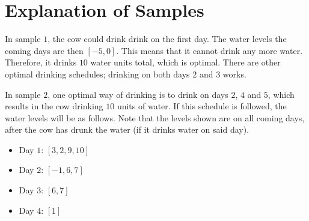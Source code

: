 \section*{Explanation of Samples}
In sample $1$, the cow could drink drink on the first day. The water levels the coming days are then
$[-5,0]$. This means that it cannot drink any more water. Therefore, it drinks $10$ water units total, which is optimal.
There are other optimal drinking schedules; drinking on both days $2$ and $3$ works.

In sample $2$, one optimal way of drinking is to drink on days $2$, $4$ and $5$, which results in the cow drinking $10$ units of water. 
If this schedule is followed, the water levels will be as follows. Note that the levels shown are on all coming days, after the cow has drunk the
water (if it drinks water on said day).
\begin{itemize}
  \item Day $1$: $[3,2,9,10]$
  \item Day $2$: $[-1,6,7]$
  \item Day $3$: $[6,7]$
  \item Day $4$: $[1]$
\end{itemize}
